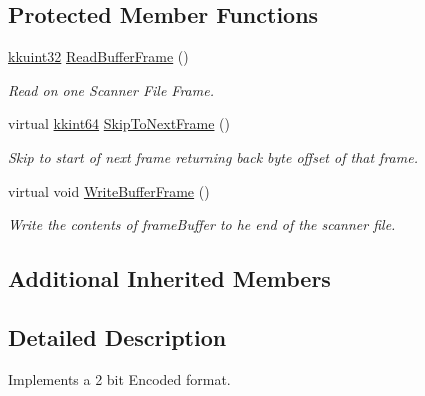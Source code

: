 \subsection*{Protected Member Functions}
\begin{DoxyCompactItemize}
\item 
\hyperlink{namespace_k_k_b_af8d832f05c54994a1cce25bd5743e19a}{kkuint32} \hyperlink{class_k_k_l_s_c_1_1_scanner_file2_bit_encoded_aacca356c7ba02957f9f7fa3913c339eb}{Read\+Buffer\+Frame} ()
\begin{DoxyCompactList}\small\item\em Read on one Scanner File Frame. \end{DoxyCompactList}\item 
virtual \hyperlink{namespace_k_k_b_aa3486b1c5ea9162b3b020c69f72826eb}{kkint64} \hyperlink{class_k_k_l_s_c_1_1_scanner_file2_bit_encoded_aa006464a1af79b156f801661c36d8416}{Skip\+To\+Next\+Frame} ()
\begin{DoxyCompactList}\small\item\em Skip to start of next frame returning back byte offset of that frame. \end{DoxyCompactList}\item 
virtual void \hyperlink{class_k_k_l_s_c_1_1_scanner_file2_bit_encoded_ac2e40bbfc9ed6663de4d58177c51760e}{Write\+Buffer\+Frame} ()
\begin{DoxyCompactList}\small\item\em Write the contents of \textquotesingle{}frame\+Buffer\textquotesingle{} to he end of the scanner file. \end{DoxyCompactList}\end{DoxyCompactItemize}
\subsection*{Additional Inherited Members}


\subsection{Detailed Description}
Implements a 2 bit Encoded format. 

